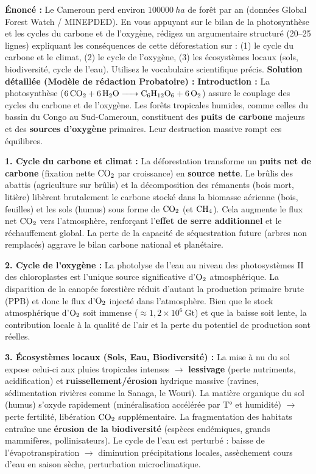 \documentclass[11pt]{article}
\begin{document}
\begin{exoresolu}
    \textbf{Énoncé :} Le Cameroun perd environ $\SI{100000}{ha}$ de forêt par an (données Global Forest Watch / MINEPDED). En vous appuyant sur le bilan de la photosynthèse et les cycles du carbone et de l'oxygène, rédigez un argumentaire structuré (20--25 lignes) expliquant les conséquences de cette déforestation sur : (1) le cycle du carbone et le climat, (2) le cycle de l'oxygène, (3) les écosystèmes locaux (sols, biodiversité, cycle de l'eau). Utilisez le vocabulaire scientifique précis.
    \tcblower
    \textbf{Solution détaillée (Modèle de rédaction Probatoire) :}
    \textbf{Introduction :} La photosynthèse ($\ce{6 CO2 + 6 H2O -> C6H12O6 + 6 O2}$) assure le couplage des cycles du carbone et de l'oxygène. Les forêts tropicales humides, comme celles du bassin du Congo au Sud-Cameroun, constituent des \textbf{puits de carbone} majeurs et des \textbf{sources d'oxygène} primaires. Leur destruction massive rompt ces équilibres.

    \textbf{1. Cycle du carbone et climat :} La déforestation transforme un \textbf{puits net de carbone} (fixation nette $\ce{CO2}$ par croissance) en \textbf{source nette}. Le brûlis des abattis (agriculture sur brûlis) et la décomposition des rémanents (bois mort, litière) libèrent brutalement le carbone stocké dans la biomasse aérienne (bois, feuilles) et les sols (humus) sous forme de $\ce{CO2}$ (et $\ce{CH4}$). Cela augmente le flux net $\ce{CO2}$ vers l'atmosphère, renforçant l'\textbf{effet de serre additionnel} et le réchauffement global. La perte de la capacité de séquestration future (arbres non remplacés) aggrave le bilan carbone national et planétaire.

    \textbf{2. Cycle de l'oxygène :} La photolyse de l'eau au niveau des photosystèmes II des chloroplastes est l'unique source significative d'$\ce{O2}$ atmosphérique. La disparition de la canopée forestière réduit d'autant la production primaire brute (PPB) et donc le flux d'$\ce{O2}$ injecté dans l'atmosphère. Bien que le stock atmosphérique d'$\ce{O2}$ soit immense ($\approx 1,2 \times 10^6\ \text{Gt}$) et que la baisse soit lente, la contribution locale à la qualité de l'air et la perte du potentiel de production sont réelles.

    \textbf{3. Écosystèmes locaux (Sols, Eau, Biodiversité) :} La mise à nu du sol expose celui-ci aux pluies tropicales intenses $\rightarrow$ \textbf{lessivage} (perte nutriments, acidification) et \textbf{ruissellement/érosion} hydrique massive (ravines, sédimentation rivières comme la Sanaga, le Wouri). La matière organique du sol (humus) s'oxyde rapidement (minéralisation accélérée par T° et humidité) $\rightarrow$ perte fertilité, libération $\ce{CO2}$ supplémentaire. La fragmentation des habitats entraîne une \textbf{érosion de la biodiversité} (espèces endémiques, grands mammifères, pollinisateurs). Le cycle de l'eau est perturbé : baisse de l'évapotranspiration $\rightarrow$ diminution précipitations locales, assèchement cours d'eau en saison sèche, perturbation microclimatique.


\end{exoresolu}
\end{document}

